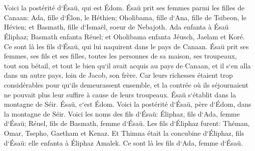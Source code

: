 \chapter{}

\verse Voici la postérité d`Ésaü, qui est Édom. 
\verse Ésaü prit ses femmes parmi les filles de Canaan: Ada, fille d`Élon, le Héthien; Oholibama, fille d`Ana, fille de Tsibeon, le Hévien; 
\verse et Basmath, fille d`Ismaël, soeur de Nebajoth. 
\verse Ada enfanta à Ésaü Éliphaz; Basmath enfanta Réuel; 
\verse et Oholibama enfanta Jéusch, Jaelam et Koré. Ce sont là les fils d`Ésaü, qui lui naquirent dans le pays de Canaan. 
\verse Ésaü prit ses femmes, ses fils et ses filles, toutes les personnes de sa maison, ses troupeaux, tout son bétail, et tout le bien qu`il avait acquis au pays de Canaan, et il s`en alla dans un autre pays, loin de Jacob, son frère. 
\verse Car leurs richesses étaient trop considérables pour qu`ils demeurassent ensemble, et la contrée où ils séjournaient ne pouvait plus leur suffire à cause de leurs troupeaux. 
\verse Ésaü s`établit dans la montagne de Séir. Ésaü, c`est Édom. 
\verse Voici la postérité d`Ésaü, père d`Édom, dans la montagne de Séir. 
\verse Voici les noms des fils d`Ésaü: Éliphaz, fils d`Ada, femme d`Ésaü; Réuel, fils de Basmath, femme d`Ésaü. 
\verse Les fils d`Éliphaz furent: Théman, Omar, Tsepho, Gaetham et Kenaz. 
\verse Et Thimna était la concubine d`Éliphaz, fils d`Ésaü: elle enfanta à Éliphaz Amalek. Ce sont là les fils d`Ada, femme d`Ésaü. 

